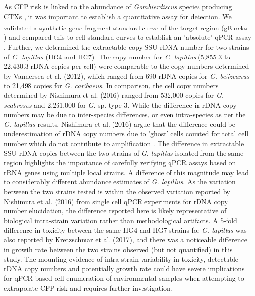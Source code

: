 \documentclass[12pt]{article}
\begin{document}
As CFP risk is linked to the abundance of \emph{Gambierdiscus} species producing CTXs \cite{globalcig,berdalet2012global}, it was important to establish a quantitative assay for detection.
We validated a synthetic gene fragment standard curve of the target region (gBlocks \textsuperscript{\textregistered}) and compared this to cell standard curves to establish an 'absolute' qPCR assay \citep{nishimura2016quantitative,hariganeya2013quantitative}. 
Further, we determined the extractable copy SSU rDNA number for two strains of \emph{G. lapillus} (HG4 and HG7). %
The copy number for \emph{G. lapillus} (5,855.3 to 22,430.3 rDNA copies per cell) %
were comparable to the copy numbers determined by Vandersea et al. (2012), which ranged from 690 rDNA copies for \emph{G. belizeanus} to 21,498 copies for \emph{G. caribaeus}. 
In comparison, the cell copy numbers determined by Nishimura et al. (2016) ranged from 532,000 copies for \emph{G. scabrosus} and 2,261,000 for \emph{G.} sp. type 3. While the difference in rDNA copy numbers may be due to inter-species differences, or even intra-species as per the \emph{G. lapillus} results, Nishimura et al. (2016) argue that the difference could be underestimation of rDNA copy numbers due to 'ghost' cells counted for total cell number which do not contribute to amplification \citep{nishimura2016quantitative,hariganeya2013quantitative}.
The difference in extractable SSU rDNA copies between the two strains of \emph{G. lapillus} isolated from the same region highlights the importance of carefully verifying qPCR assays based on rRNA genes using multiple local strains.  
A difference of this magnitude may lead to considerably different abundance estimates of \textit{G. lapillus}. 
As the variation between the two strains tested is within the observed variation reported by Nishimura et al. (2016) from single cell qPCR experiments for rDNA copy number elucidation, the difference reported here is likely representative of biological intra-strain variation rather than methodological artifacts. 
A 5-fold difference in toxicity between the same HG4 and HG7 strains for \emph{G. lapillus} was also reported by Kretzschmar et al. (2017), and there was a noticeable difference in growth rate between the two strains observed (but not quantified) in this study. 
The mounting evidence of intra-strain variability in toxicity, detectable rDNA copy numbers and potentially growth rate could have severe implications for qPCR based cell enumeration of environmental samples when attempting to extrapolate CFP risk and requires further investigation.\\
\end{document}

